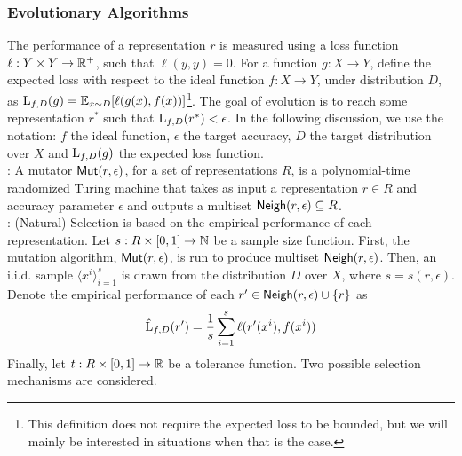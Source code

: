 \subsubsection*{Evolutionary Algorithms}

The performance of a representation $r$ is measured using a loss function $\ell
: Y \times Y \rightarrow \mathbb{R}^+$, such that $\ell(y, y) = 0$. For a function
$g : X \rightarrow Y$, define the expected loss with respect to the ideal
function $f : X \rightarrow Y$, under distribution $D$, as $\mathrm{L}_{f, D}(g) =
\mathbb{E}_{x \sim D}[\ell(g(x), f(x))]$\footnote{This definition does not require the
expected loss to be bounded, but we will mainly be interested in situations when
that is the case.}. The goal of evolution is to reach some representation $r^*$
such that $\mathrm{L}_{f, D}(r^*) < \epsilon$. In the following discussion, we use
the notation: $f$ the ideal function, $\epsilon$ the target accuracy, $D$ the
target distribution over $X$ and $\mathrm{L}_{f, D}(g)$ the expected loss function.  \medskip \\
%
: A mutator $\mathsf{Mut}(r, \epsilon)$, for a set of representations $R$, is
a polynomial-time randomized Turing machine that takes as input a representation
$r \in R$ and accuracy parameter $\epsilon$ and outputs a multiset $\mathsf{Neigh}(r,
\epsilon) \subseteq R$. \medskip \\
%
: (Natural) Selection is based on the empirical performance
of each representation. Let $s : R \times [0, 1] \rightarrow \mathbb{N}$ be a
sample size function. First, the mutation algorithm, $\mathsf{Mut}(r, \epsilon)$, is run
to produce multiset $\mathsf{Neigh}(r, \epsilon)$. Then, an i.i.d. sample $\langle x^i
\rangle_{i=1}^s$ is drawn from the distribution $D$ over $X$, where $s = s(r,
\epsilon)$.  Denote the empirical performance of each $r^\prime \in \mathsf{Neigh}(r,
\epsilon) \cup \{r \}$ as
%
\[ \hat{\mathrm{L}}_{f, D}(r^\prime) = \frac{1}{s}\sum_{i=1}^s \ell(r^\prime(x^i),
f(x^i)) \]
%
Finally, let $t : R \times [0, 1] \rightarrow \mathbb{R}$ be a tolerance function.
Two possible selection mechanisms are considered.
